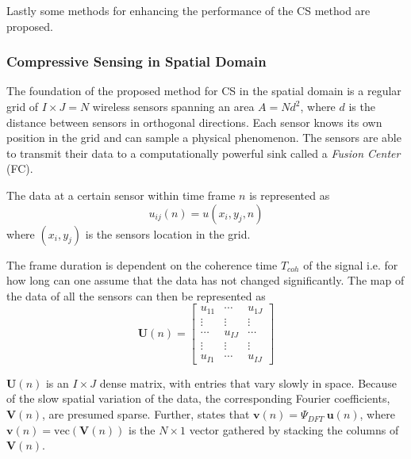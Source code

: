 \documentclass[Main]{subfiles}
\begin{document}
		Lastly some methods for enhancing the performance of the CS method are proposed.
		
		\subsubsection{Compressive Sensing in Spatial Domain} %
		\label{sub:compressive_sensing_in_spatial_domain}

			The foundation of the proposed method for CS in the spatial domain is a regular grid of $I \times J = N$ wireless sensors spanning an area $A = Nd^2$, where $d$ is the distance between sensors in orthogonal directions.
			Each sensor knows its own position in the grid and can sample a physical phenomenon.
			The sensors are able to transmit their data to a computationally powerful sink called a \emph{Fusion Center} (FC).

			The data at a certain sensor within time frame $n$ is represented as
			\begin{equation}
				u_{ij}(n) = u(x_i, y_j, n)
			\end{equation}
			where $(x_i, y_j)$ is the sensors location in the grid.

			The frame duration is dependent on the coherence time $T_{coh}$ of the signal i.e. for how long can one assume that the data has not changed significantly.
			The map of the data of all the sensors can then be represented as
			\begin{equation}
				\mathbf{U}(n) =
			 	\begin{bmatrix}
			  		u_{11}	&	\cdots 	& 	u_{1J}	\\
			  		\vdots	&	\vdots	&	\vdots	\\
					\cdots 	& 	u_{IJ}	& 	\cdots 	\\
					\vdots	&	\vdots	&	\vdots	\\
					u_{I1} 	& 	\cdots 	& 	u_{IJ}
				\end{bmatrix}
				\label{eq:dataMap}
			\end{equation}
			
			$\mathbf{U}(n)$ is an $I \times J$ dense matrix, with entries that vary slowly in space.
			Because of the slow spatial variation of the data, the corresponding Fourier coefficients, $\mathbf{V}(n)$, are presumed sparse.
			Further, \cite{Fazel2011} states that $\mathbf{v}(n) = \Psi_{DFT}\ \mathbf{u}(n)$, where $\mathbf{v}(n) = \text{vec}(\mathbf{V}(n))$ is the $N \times 1$ vector gathered by stacking the columns of $\mathbf{V}(n)$.
\end{document}
